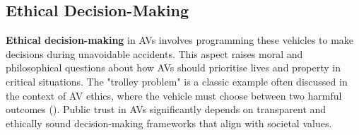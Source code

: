 


\subsection{Ethical Decision-Making}
\textbf{Ethical decision-making} in AVs involves programming these vehicles to make decisions during unavoidable accidents. This aspect raises moral and philosophical questions about how AVs should prioritise lives and property in critical situations. The "trolley problem" is a classic example often discussed in the context of AV ethics, where the vehicle must choose between two harmful outcomes (\cite{lin2016}). Public trust in AVs significantly depends on transparent and ethically sound decision-making frameworks that align with societal values.

